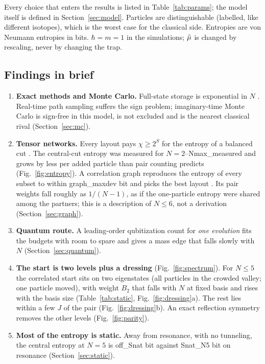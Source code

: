 Every choice that enters the results is listed in Table~\ref{tab:params}; the model itself is defined in
Section~\ref{sec:model}. Particles are distinguishable (labelled, like different isotopes), which is the worst case for the
classical side. Entropies are von Neumann entropies in bits. $\hbar=m=1$ in the simulations; $\tilde{\mu}$ is changed by
rescaling, never by changing the trap.



\subsection{Findings in brief}
\label{sec:findings}

\begin{enumerate}[itemsep=0.2em]
\item \textbf{Exact methods and Monte Carlo.} Full-state storage is exponential in $N$ \stE{}. Real-time path sampling suffers the sign problem; imaginary-time Monte Carlo is sign-free in this model, is not excluded and is the nearest classical rival (Section~\ref{sec:mc}).
\item \textbf{Tensor networks.} Every layout pays $\chi\ge2^{S}$ for the entropy of a balanced cut \stE{}. The central-cut entropy was measured for
  $N=2$--\num{Nmax_measured} and grows by less per added particle than pair counting predicts (Fig.~\ref{fig:entropy}). A correlation graph reproduces the entropy of every subset to
  within \num{graph_maxdev} bit and picks the best layout \stM{}. Its pair weights fall roughly as $1/(N-1)$, as if the one-particle entropy were shared among the partners; this is
  a description of $N\le6$, not a derivation (Section~\ref{sec:graph}).
\item \textbf{Quantum route.} A leading-order qubitization count for \emph{one evolution} fits the budgets with room to spare and gives a mass edge that falls slowly with $N$ \stM{} (Section~\ref{sec:quantum}).
\item \textbf{The start is two levels plus a dressing} (Fig.~\ref{fig:spectrum}). For $N\le5$ the correlated start sits on two eigenstates (all particles in the crowded valley; one particle moved), with
  weight $B_2$ that falls with $N$ at fixed basis and rises with the basis size (Table~\ref{tab:static}, Fig.~\ref{fig:dressing}a). The rest lies within a few $J$ of the pair
  (Fig.~\ref{fig:dressing}b). An exact reflection symmetry removes the other levels (Fig.~\ref{fig:parity}).
\item \textbf{Most of the entropy is static.} Away from resonance, with no tunneling, the central entropy at $N=5$ is \num{off_Snat} bit against \num{Snat_N5} bit on resonance (Section~\ref{sec:static}).

\end{enumerate}

